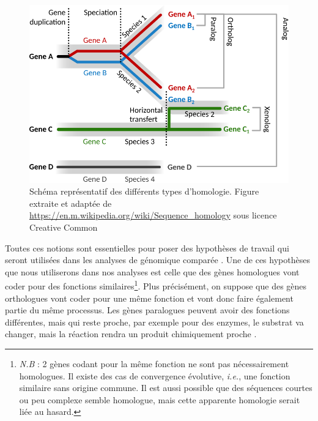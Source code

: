 \begin{figure}[htbp]
    \centering
    \includegraphics[width=.9\textwidth]{images/homologs.png}
    \caption[Schéma représentatif des différents types d'homologie]{Schéma représentatif des différents types d'homologie. Figure extraite et adaptée de \url{https://en.m.wikipedia.org/wiki/Sequence_homology} sous licence Creative Common}
    \label{fig:homologue}
\end{figure}

Toutes ces notions sont essentielles pour poser des hypothèses de travail qui seront utilisées dans les analyses de génomique comparée \cite{koonin_orthologs_2005,stamboulian_ortholog_2020}. Une de ces hypothèses que nous utiliserons dans nos analyses est celle que des gènes homologues vont coder pour des fonctions similaires\footnote{\textit{N.B} : 2 gènes codant pour la même fonction ne sont pas nécessairement homologues. Il existe des cas de convergence évolutive, \textit{i.e.}, une fonction similaire sans origine commune. Il est aussi possible que des séquences courtes ou peu complexe semble homologue, mais cette apparente homologie serait liée au hasard.}. Plus précisément, on suppose que des gènes orthologues vont coder pour une même fonction et vont donc faire également partie du même processus. Les gènes paralogues peuvent avoir des fonctions différentes, mais qui reste proche, par exemple pour des enzymes, le substrat va changer, mais la réaction rendra un produit chimiquement proche \cite{mirny_using_2002}.